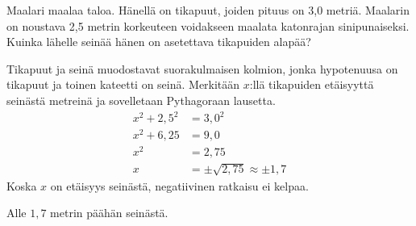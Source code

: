 \begin{esimerkki}
	Maalari maalaa taloa. Hänellä on tikapuut, joiden pituus on 3,0 metriä. Maalarin on
	noustava 2,5 metrin korkeuteen voidakseen maalata katonrajan sinipunaiseksi. Kuinka
	lähelle seinää hänen on asetettava tikapuiden alapää?
	\begin{esimratk}
		Tikapuut ja seinä muodostavat suorakulmaisen kolmion, jonka hypotenuusa on tikapuut
		ja toinen kateetti on seinä. Merkitään $x$:llä tikapuiden etäisyyttä seinästä
		metreinä ja sovelletaan Pythagoraan lausetta.
		\begin{align*}
		x^2 + 2,5^2 &= 3,0^2 \\
		x^2 + 6,25 &= 9,0 \\
		x^2 &= 2,75 \\
		x &= \pm \sqrt{2,75} \approx \pm 1,7
		\end{align*}
		Koska $x$ on etäisyys seinästä, negatiivinen ratkaisu ei kelpaa.
		\begin{esimvast}
		Alle $1,7$ metrin päähän seinästä. 
		\end{esimvast}
	\end{esimratk}
\end{esimerkki}



